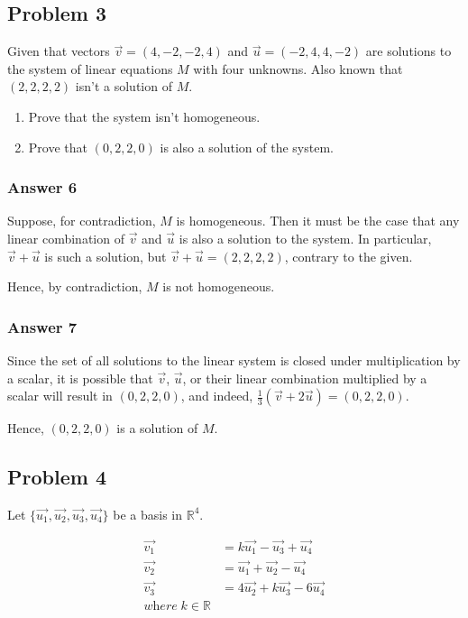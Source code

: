 \documentclass[11pt]{article}
\begin{document}
\subsection{Problem 3}
\label{sec:orgheadline10}
Given that vectors \(\vec{v}=(4, -2, -2, 4)\) and \(\vec{u}=(-2, 4, 4, -2)\) are
solutions to the system of linear equations \(M\) with four unknowns.  Also
known that \((2, 2, 2, 2)\) isn't a solution of \(M\).

\begin{enumerate}
\item Prove that the system isn't homogeneous.
\item Prove that \((0, 2, 2, 0)\) is also a solution of the system.
\end{enumerate}

\subsubsection{Answer 6}
\label{sec:orgheadline8}
Suppose, for contradiction, \(M\) is homogeneous.  Then it must be the case
that any linear combination of \(\vec{v}\) and \(\vec{u}\) is also a solution
to the system.  In particular, \(\vec{v}+\vec{u}\) is such a solution, but
\(\vec{v}+\vec{u} = (2, 2, 2, 2)\), contrary to the given.

Hence, by contradiction, \(M\) is not homogeneous.

\subsubsection{Answer 7}
\label{sec:orgheadline9}
Since the set of all solutions to the linear system is closed under
multiplication by a scalar, it is possible that \(\vec{v}\), \(\vec{u}\), or
their linear combination multiplied by a scalar will result in \((0, 2, 2,
    0)\), and indeed, \(\frac{1}{3}(\vec{v}+2\vec{u})=(0, 2, 2, 0)\).

Hence, \((0, 2, 2, 0)\) is a solution of \(M\).

\subsection{Problem 4}
\label{sec:orgheadline14}
Let \(\{\vec{u_1}, \vec{u_2}, \vec{u_3}, \vec{u_4}\}\) be a basis in \(\mathbb{R}^4\).

\begin{align*}
  \vec{v_1} &= k\vec{u_1} - \vec{u_3} + \vec{u_4} \\
  \vec{v_2} &= \vec{u_1} + \vec{u_2} - \vec{u_4} \\
  \vec{v_3} &= 4\vec{u_2} + k\vec{u_3} - 6\vec{u_4} \\
  \textit{where}\; k \in \mathbb{R}
\end{align*}
\end{document}
